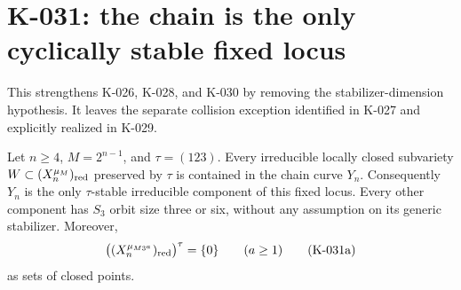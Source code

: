 \section{K-031: the chain is the only cyclically stable fixed locus}

This strengthens K-026, K-028, and K-030 by removing the
stabilizer-dimension hypothesis.  It leaves the separate collision
exception identified in K-027 and explicitly realized in K-029.

\begin{theorem}[K-031a]
Let $n\ge4$, $M=2^{n-1}$, and $\tau=(123)$.  Every irreducible
locally closed subvariety $W\subset (X_n^{\mu_M})_{\rm red}$
preserved by $\tau$ is contained in the chain curve $Y_n$.
Consequently $Y_n$ is the only $\tau$-stable irreducible component
of this fixed locus.  Every other component has $S_3$ orbit size
three or six, without any assumption on its generic stabilizer.
Moreover,
\[
       \bigl((X_n^{\mu_{M3^a}})_{\rm red}\bigr)^{\tau}
                             =\{0\}\qquad(a\ge1)
                                                        \tag{K-031a}
\]
as sets of closed points.
\end{theorem}

